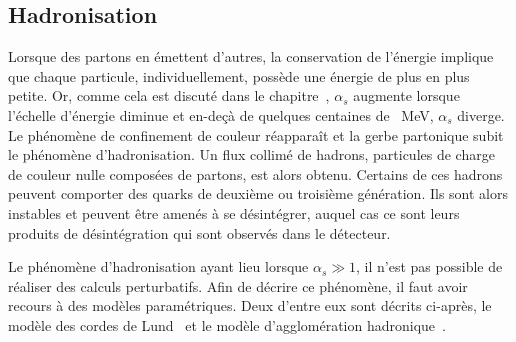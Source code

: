 \subsection{Hadronisation}\label{chapter-JERC-section-jets-subsec-hadronisation}
Lorsque des partons en émettent d'autres, la conservation de l'énergie implique que chaque particule, individuellement, possède une énergie de plus en plus petite.
Or, comme cela est discuté dans le chapitre~, $\alpha_s$ augmente lorsque l'échelle d'énergie diminue et en-deçà de quelques centaines de \SI{}{\MeV}, $\alpha_s$ diverge.
Le phénomène de confinement de couleur réapparaît et la gerbe partonique subit le phénomène d'hadronisation.
Un flux collimé de hadrons, particules de charge de couleur nulle composées de partons, est alors obtenu.
Certains de ces hadrons peuvent comporter des quarks de deuxième ou troisième génération. Ils sont alors instables et peuvent être amenés à se désintégrer, auquel cas ce sont leurs produits de désintégration qui sont observés dans le détecteur.
\par Le phénomène d'hadronisation ayant lieu lorsque $\alpha_s\gg1$, il n'est pas possible de réaliser des calculs perturbatifs. Afin de décrire ce phénomène, il faut avoir recours à des modèles paramétriques. Deux d'entre eux sont décrits ci-après, le modèle des cordes de Lund~\cite{Andersson_parton_fragmentation} et le modèle d'agglomération hadronique~\cite{Winter_2004}.
